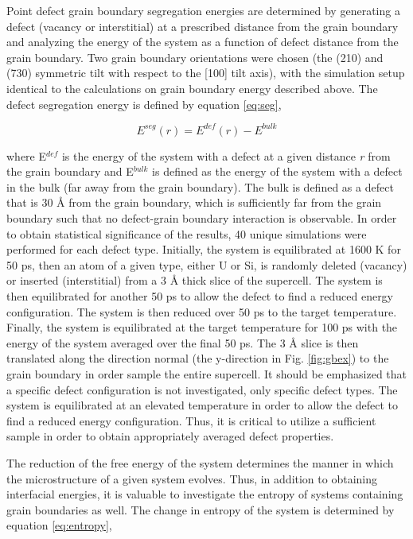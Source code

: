 \documentclass[review]{elsarticle}
\begin{document}
Point defect grain boundary segregation energies are determined by generating a defect (vacancy or interstitial) at a prescribed distance from the grain boundary and analyzing the energy of the system as a function of defect distance from the grain boundary. Two grain boundary orientations were chosen (the (210) and (730) symmetric tilt with respect to the [100] tilt axis), with the simulation setup identical to the calculations on grain boundary energy described above. The defect segregation energy is defined by equation \ref{eq:seg},

\begin{equation}
\label{eq:seg}
E^{seg}(r)= E^{def}(r) - E^{bulk}
\end{equation}

where E$^{def}$ is the energy of the system with a defect at a given distance \textit{r} from the grain boundary and E$^{bulk}$ is defined as the energy of the system with a defect in the bulk (far away from the grain boundary). The bulk is defined as a defect that is 30 {\AA} from the grain boundary, which is sufficiently far from the grain boundary such that no defect-grain boundary interaction is observable. In order to obtain statistical significance of the results, 40 unique simulations were performed for each defect type. Initially, the system is equilibrated at 1600 K for 50 ps, then an atom of a given type, either U or Si, is randomly deleted (vacancy) or inserted (interstitial) from a 3 {\AA} thick slice of the supercell. The system is then equilibrated for another 50 ps to allow the defect to find a reduced energy configuration. The system is then reduced over 50 ps to the target temperature. Finally, the system is equilibrated at the target temperature for 100 ps with the energy of the system averaged over the final 50 ps. The 3 {\AA} slice is then translated along the direction normal (the y-direction in Fig. \ref{fig:gbex}) to the grain boundary in order sample the entire supercell. It should be emphasized that a specific defect configuration is not investigated, only specific defect types. The system is equilibrated at an elevated temperature in order to allow the defect to find a reduced energy configuration. Thus, it is critical to utilize a sufficient sample in order to obtain appropriately averaged defect properties.

The reduction of the free energy of the system determines the manner in which the microstructure of a given system evolves. Thus, in addition to obtaining interfacial energies, it is valuable to investigate the entropy of systems containing grain boundaries as well. The change in entropy of the system is determined by equation \ref{eq:entropy},
\end{document}
